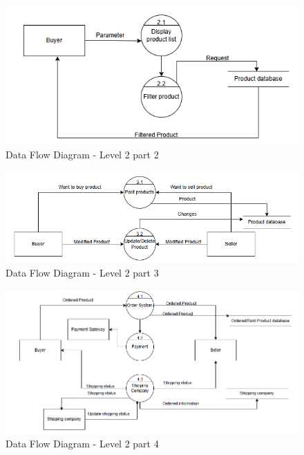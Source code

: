 \begin{figure}[!h]
	\centering
	\includegraphics[width=1\textwidth]{chapters/ch-03/DFDL2_2.png} %
	\caption{Data Flow Diagram - Level 2 part 2}
	\label{fig:DFD2_2} %
\end{figure}

\begin{figure}[!h]
	\centering
	\includegraphics[width=1\textwidth]{chapters/ch-03/DFDL2_3.png} %
	\caption{Data Flow Diagram - Level 2 part 3}
	\label{fig:DFD2_3} %
\end{figure}

\begin{figure}[!h]
	\centering
	\includegraphics[width=1\textwidth]{chapters/ch-03/DFDL2_4.png} %
	\caption{Data Flow Diagram - Level 2 part 4}
	\label{fig:DFD2_4} %
\end{figure}



